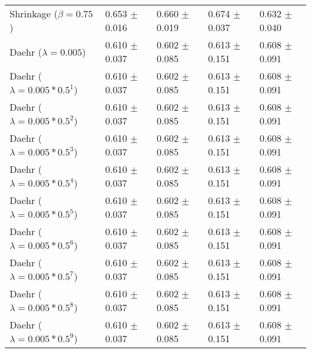 \begin{table}
\begin{tabular}{*{5}{l}}
Shrinkage ($\beta=0.75$)&0.653 $\pm$ 0.016&0.660 $\pm$ 0.019&0.674 $\pm$ 0.037&0.632 $\pm$ 0.040\\
Daehr ($\lambda=0.005$)&0.610 $\pm$ 0.037&0.602 $\pm$ 0.085&0.613 $\pm$ 0.151&0.608 $\pm$ 0.091\\
Daehr ($\lambda=0.005*0.5^1$)&0.610 $\pm$ 0.037&0.602 $\pm$ 0.085&0.613 $\pm$ 0.151&0.608 $\pm$ 0.091\\
Daehr ($\lambda=0.005*0.5^2$)&0.610 $\pm$ 0.037&0.602 $\pm$ 0.085&0.613 $\pm$ 0.151&0.608 $\pm$ 0.091\\
Daehr ($\lambda=0.005*0.5^3$)&0.610 $\pm$ 0.037&0.602 $\pm$ 0.085&0.613 $\pm$ 0.151&0.608 $\pm$ 0.091\\
Daehr ($\lambda=0.005*0.5^4$)&0.610 $\pm$ 0.037&0.602 $\pm$ 0.085&0.613 $\pm$ 0.151&0.608 $\pm$ 0.091\\
Daehr ($\lambda=0.005*0.5^5$)&0.610 $\pm$ 0.037&0.602 $\pm$ 0.085&0.613 $\pm$ 0.151&0.608 $\pm$ 0.091\\
Daehr ($\lambda=0.005*0.5^6$)&0.610 $\pm$ 0.037&0.602 $\pm$ 0.085&0.613 $\pm$ 0.151&0.608 $\pm$ 0.091\\
Daehr ($\lambda=0.005*0.5^7$)&0.610 $\pm$ 0.037&0.602 $\pm$ 0.085&0.613 $\pm$ 0.151&0.608 $\pm$ 0.091\\
Daehr ($\lambda=0.005*0.5^8$)&0.610 $\pm$ 0.037&0.602 $\pm$ 0.085&0.613 $\pm$ 0.151&0.608 $\pm$ 0.091\\
Daehr ($\lambda=0.005*0.5^9$)&0.610 $\pm$ 0.037&0.602 $\pm$ 0.085&0.613 $\pm$ 0.151&0.608 $\pm$ 0.091\\
\bottomrule
\end{tabular}
\end{table}

